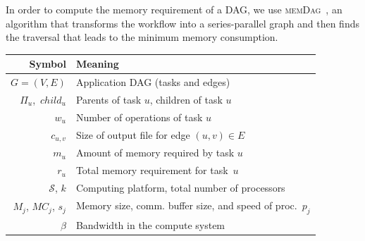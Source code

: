 \documentclass[conference]{IEEEtran}
\newcommand{\algo}[1]{\textsc{#1}}
\newcommand{\parents}[1]{\,\Pi_{#1}}
\newcommand{\children}[1]{\,child_{#1}}
\newcommand{\cluster}{\,\mathcal{S}}
\begin{document}
In order to compute the memory requirement of a DAG, we use \algo{memDag}~\cite{KAYAASLAN20181},
an algorithm that 
    transforms the workflow into a series-parallel graph
    and then finds the traversal that leads to the minimum memory consumption.

    \begin{table}
        \begin{center}
            \begin{tabular}{rl}
                \hline
                \textbf{Symbol}                       & \textbf{Meaning}                                         \\
                \hline
                $G = (V, E)$                          & Application DAG (tasks and edges)       \\
                $\parents{u}$, $\children{u}$         & Parents of task $u$, children of task $u$            \\
                $w_u$                                 & Number of operations of task $u$         \\
                $c_{u,v}$                             & Size of output file for edge $(u,v)\in E$         \\
                $m_u$                                 & Amount of memory required by task $u$                                \\
                $r_u$ 				& Total memory requirement for task~$u$ \\
                $\cluster$, $k$                    & Computing platform, total number of processors           \\
                $M_j$, $MC_j$, $s_j$                               & Memory size, comm. buffer size, and speed of proc.\ $p_j$                          \\
                $\beta$                     & Bandwidth in the compute system                                \\

\end{tabular}
\end{center}
\end{table}
\end{document}
